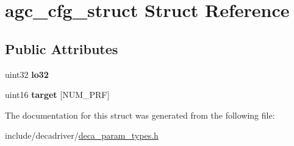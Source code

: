 \hypertarget{structagc__cfg__struct}{\section{agc\-\_\-cfg\-\_\-struct Struct Reference}
\label{structagc__cfg__struct}
}
\subsection*{Public Attributes}
\begin{DoxyCompactItemize}
\item 
\hypertarget{structagc__cfg__struct_ae2f3b1b05d9c8bd16c5d41e73a20cae4}{uint32 {\bfseries lo32}}\label{structagc__cfg__struct_ae2f3b1b05d9c8bd16c5d41e73a20cae4}

\item 
\hypertarget{structagc__cfg__struct_a82950cee70a7988864d9ba0f7575997b}{uint16 {\bfseries target} \mbox{[}N\-U\-M\-\_\-\-P\-R\-F\mbox{]}}\label{structagc__cfg__struct_a82950cee70a7988864d9ba0f7575997b}

\end{DoxyCompactItemize}


The documentation for this struct was generated from the following file\-:\begin{DoxyCompactItemize}
\item 
include/decadriver/\hyperlink{deca__param__types_8h}{deca\-\_\-param\-\_\-types.\-h}\end{DoxyCompactItemize}
